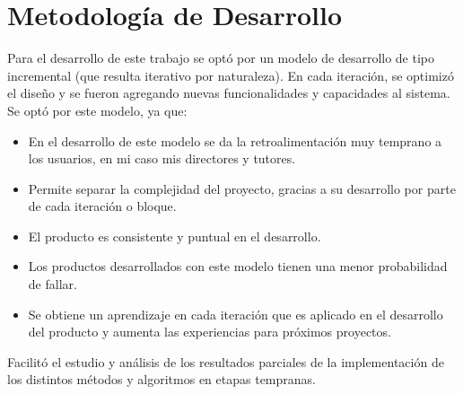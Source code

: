 \chapter{Metodología de Desarrollo}
\label{chap:metodologia}
Para el desarrollo de este trabajo se opt\'o por un modelo de desarrollo de tipo incremental (que resulta iterativo por naturaleza).
En cada iteraci\'on, se optimiz\'o el dise\~no y se fueron agregando nuevas funcionalidades y capacidades al sistema.\\

Se opt\'o por este modelo, ya que:
\begin{itemize}
\item En el desarrollo de este modelo se da la retroalimentaci\'on muy temprano a los usuarios, en mi caso mis directores y tutores.
\item Permite separar la complejidad del proyecto, gracias a su desarrollo por parte de cada iteraci\'on o bloque.
\item El producto es consistente y puntual en el desarrollo.
\item Los productos desarrollados con este modelo tienen una menor probabilidad de fallar.
\item Se obtiene un aprendizaje en cada iteraci\'on que es aplicado en el desarrollo del producto y aumenta las experiencias para pr\'oximos proyectos.
\end{itemize}

Facilit\'o el estudio y an\'alisis de los resultados parciales de la implementaci\'on de los distintos m\'etodos y algoritmos en etapas tempranas.


